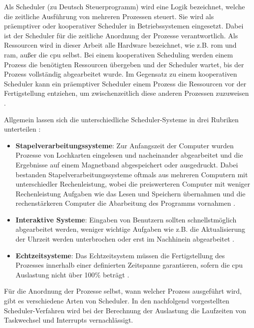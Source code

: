 \documentclass[../EDF Master Thesis.tex]{subfiles}
\begin{document}
Als Scheduler (zu Deutsch Steuerprogramm) wird eine Logik bezeichnet, welche die zeitliche Ausführung von mehreren Prozessen steuert.
Sie wird als präemptiver oder kooperativer Scheduler in Betriebssystemen eingesetzt.
Dabei ist der Scheduler für die zeitliche Anordnung der Prozesse verantwortlich.
Als Ressourcen wird in dieser Arbeit alle Hardware bezeichnet, wie z.B. \ac{rom} und \ac{ram}, außer die \ac{cpu} selbst.
Bei einem kooperativen Scheduling werden einem Prozess die benötigten Ressourcen übergeben und der Scheduler wartet, bis der Prozess vollständig abgearbeitet wurde.
Im Gegensatz zu einem kooperativen Scheduler kann ein präemptiver Scheduler einem Prozess die Ressourcen vor der Fertigstellung entziehen, um zwischenzeitlich diese anderen Prozessen zuzuweisen \parencite{mikrocontroller:001}.

Allgemein lassen sich die unterschiedliche Scheduler-Systeme in drei Rubriken unterteilen \parencite{wiki:007}:
\begin{itemize}
    \item \textbf{Stapelverarbeitungssysteme}: Zur Anfangszeit der Computer wurden Prozesse von Lochkarten eingelesen und nacheinander abgearbeitet und die Ergebnisse auf einem Magnetband abgespeichert oder ausgedruckt.
                                               Dabei bestanden Stapelverarbeitungssysteme oftmals aus mehreren Computern mit unterschiedler Rechenleistung, wobei die preiswerteren Computer mit weniger Rechenleistung Aufgaben wie das Lesen und Speichern übernahmen und die rechenstärkeren Computer die Abarbeitung des Programms vornahmen \autocite{grundkurs_betriebssysteme}.
    \item \textbf{Interaktive Systeme}: Eingaben von Benutzern sollten schnellstmöglich abgearbeitet werden, weniger wichtige Aufgaben wie z.B. die Aktualisierung der Uhrzeit werden unterbrochen oder erst im Nachhinein abgearbeitet \autocite{mikrocontroller:002}.
    \item \textbf{Echtzeitsysteme}: Das Echtzeitsystem müssen die Fertigstellung des Prozesses innerhalb einer definierten Zeitspanne garantieren, sofern die \ac{cpu} Auslastung nicht über 100\% beträgt \autocite{mikrocontroller:002}.
\end{itemize}

Für die Anordnung der Prozesse selbst, wann welcher Prozess ausgeführt wird, gibt es verschiedene Arten von Scheduler.
In den nachfolgend vorgestellten Scheduler-Verfahren wird bei der Berechnung der Auslastung die Laufzeiten von Taskwechsel und Interrupts vernachlässigt.
\end{document}
